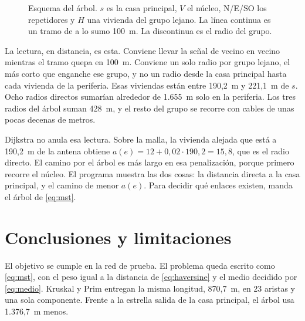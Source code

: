 \documentclass[12pt,a4paper]{article}
\begin{document}
\begin{figure}[ht]
  \centering
  \caption{Esquema del árbol. \(s\) es la casa principal, \(V\) el núcleo, N/E/SO los repetidores y \(H\) una vivienda del grupo lejano. La línea continua es un tramo de a lo sumo 100~m. La discontinua es el radio del grupo.}
  \label{fig:esquema}
\end{figure}

La lectura, en distancia, es esta. Conviene llevar la señal de vecino en vecino mientras el tramo quepa en 100~m. Conviene un solo radio por grupo lejano, el más corto que enganche ese grupo, y no un radio desde la casa principal hasta cada vivienda de la periferia. Esas viviendas están entre 190,2~m y 221,1~m de \(s\). Ocho radios directos sumarían alrededor de 1.655~m solo en la periferia. Los tres radios del árbol suman 428~m, y el resto del grupo se recorre con cables de unas pocas decenas de metros.

Dijkstra no anula esa lectura. Sobre la malla, la vivienda alejada que está a 190,2~m de la antena obtiene \(a(e) = 12 + 0{,}02 \cdot 190{,}2 = 15{,}8\), que es el radio directo. El camino por el árbol es más largo en esa penalización, porque primero recorre el núcleo. El programa muestra las dos cosas: la distancia directa a la casa principal, y el camino de menor \(a(e)\). Para decidir qué enlaces existen, manda el árbol de \eqref{eq:mst}.

\section{Conclusiones y limitaciones}

El objetivo se cumple en la red de prueba. El problema queda escrito como \eqref{eq:mst}, con el peso igual a la distancia de \eqref{eq:haversine} y el medio decidido por \eqref{eq:medio}. Kruskal y Prim entregan la misma longitud, 870,7~m, en 23 aristas y una sola componente. Frente a la estrella salida de la casa principal, el árbol usa 1.376,7~m menos.
\end{document}
